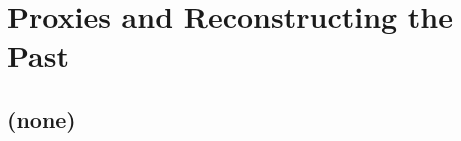 
\cleardoublepage


\chapter{Proxies and Reconstructing the Past}\label{ch:proxies}

\hfill \break

\newpage

\section{(none)}

